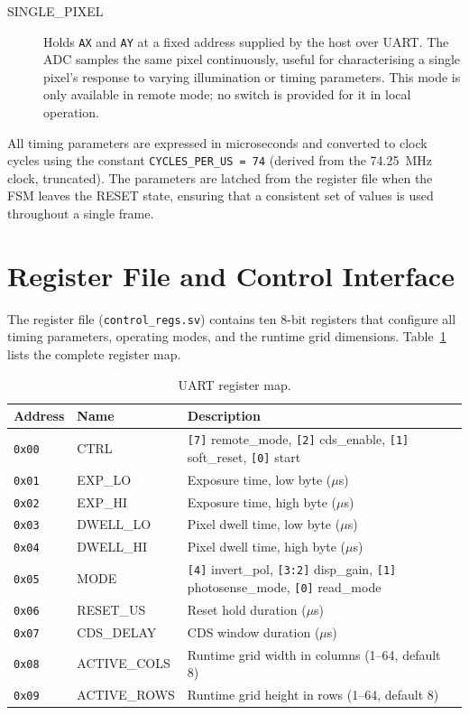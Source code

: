 \begin{description}
  \item[SINGLE\_PIXEL] Holds \texttt{AX} and \texttt{AY} at a fixed address supplied by the host over UART. The ADC samples the same pixel continuously, useful for characterising a single pixel's response to varying illumination or timing parameters. This mode is only available in remote mode; no switch is provided for it in local operation.
\end{description}

All timing parameters are expressed in microseconds and converted to clock cycles using the constant \texttt{CYCLES\_PER\_US = 74} (derived from the 74.25~MHz clock, truncated). The parameters are latched from the register file when the FSM leaves the RESET state, ensuring that a consistent set of values is used throughout a single frame.



\section{Register File and Control Interface}

The register file (\texttt{control\_regs.sv}) contains ten 8-bit registers that configure all timing parameters, operating modes, and the runtime grid dimensions. Table~\ref{tab:regmap} lists the complete register map.

\begin{table}[h]
\centering
\caption{UART register map.}
\label{tab:regmap}
\begin{tabular}{llp{7cm}}
\hline
\textbf{Address} & \textbf{Name} & \textbf{Description} \\
\hline
\texttt{0x00} & CTRL        & \texttt{[7]} remote\_mode, \texttt{[2]} cds\_enable,
                               \texttt{[1]} soft\_reset, \texttt{[0]} start \\
\texttt{0x01} & EXP\_LO     & Exposure time, low byte ($\mu$s) \\
\texttt{0x02} & EXP\_HI     & Exposure time, high byte ($\mu$s) \\
\texttt{0x03} & DWELL\_LO   & Pixel dwell time, low byte ($\mu$s) \\
\texttt{0x04} & DWELL\_HI   & Pixel dwell time, high byte ($\mu$s) \\
\texttt{0x05} & MODE        & \texttt{[4]} invert\_pol, \texttt{[3:2]} disp\_gain,
                               \texttt{[1]} photosense\_mode, \texttt{[0]} read\_mode \\
\texttt{0x06} & RESET\_US   & Reset hold duration ($\mu$s) \\
\texttt{0x07} & CDS\_DELAY  & CDS window duration ($\mu$s) \\
\texttt{0x08} & ACTIVE\_COLS & Runtime grid width in columns (1--64, default 8) \\
\texttt{0x09} & ACTIVE\_ROWS & Runtime grid height in rows (1--64, default 8) \\
\hline
\end{tabular}
\end{table}

